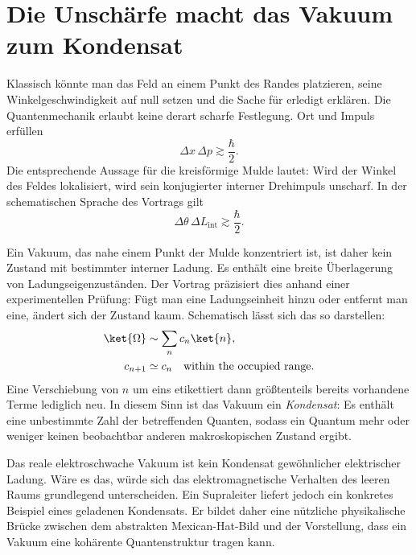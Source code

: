 \section{Die Unschärfe macht das Vakuum zum Kondensat}

Klassisch könnte man das Feld an einem Punkt des Randes platzieren, seine Winkelgeschwindigkeit auf null setzen und die Sache für erledigt erklären. Die Quantenmechanik erlaubt keine derart scharfe Festlegung. Ort und Impuls erfüllen
\begin{equation}
\Delta x\,\Delta p\gtrsim\frac{\hbar}{2}.
\end{equation}
Die entsprechende Aussage für die kreisförmige Mulde lautet: Wird der Winkel des Feldes lokalisiert, wird sein konjugierter interner Drehimpuls unscharf. In der schematischen Sprache des Vortrags gilt
\begin{equation}
\Delta\theta\,\Delta L_{\mathrm{int}}
\gtrsim
\frac{\hbar}{2}.
\end{equation}

Ein Vakuum, das nahe einem Punkt der Mulde konzentriert ist, ist daher kein Zustand mit bestimmter interner Ladung. Es enthält eine breite Überlagerung von Ladungseigenzuständen. Der Vortrag präzisiert dies anhand einer experimentellen Prüfung: Fügt man eine Ladungseinheit hinzu oder entfernt man eine, ändert sich der Zustand kaum. Schematisch lässt sich das so darstellen:
\begin{align}
\ket{\Omega}
&\sim
\sum_n c_n\ket{n},
\\
c_{n+1}
&\simeq
c_n
\quad\text{within the occupied range}.
\end{align}
Eine Verschiebung von $n$ um eins etikettiert dann größtenteils bereits vorhandene Terme lediglich neu. In diesem Sinn ist das Vakuum ein \emph{Kondensat}: Es enthält eine unbestimmte Zahl der betreffenden Quanten, sodass ein Quantum mehr oder weniger keinen beobachtbar anderen makroskopischen Zustand ergibt.

Das reale elektroschwache Vakuum ist kein Kondensat gewöhnlicher elektrischer Ladung. Wäre es das, würde sich das elektromagnetische Verhalten des leeren Raums grundlegend unterscheiden. Ein Supraleiter liefert jedoch ein konkretes Beispiel eines geladenen Kondensats. Er bildet daher eine nützliche physikalische Brücke zwischen dem abstrakten Mexican-Hat-Bild und der Vorstellung, dass ein Vakuum eine kohärente Quantenstruktur tragen kann.


